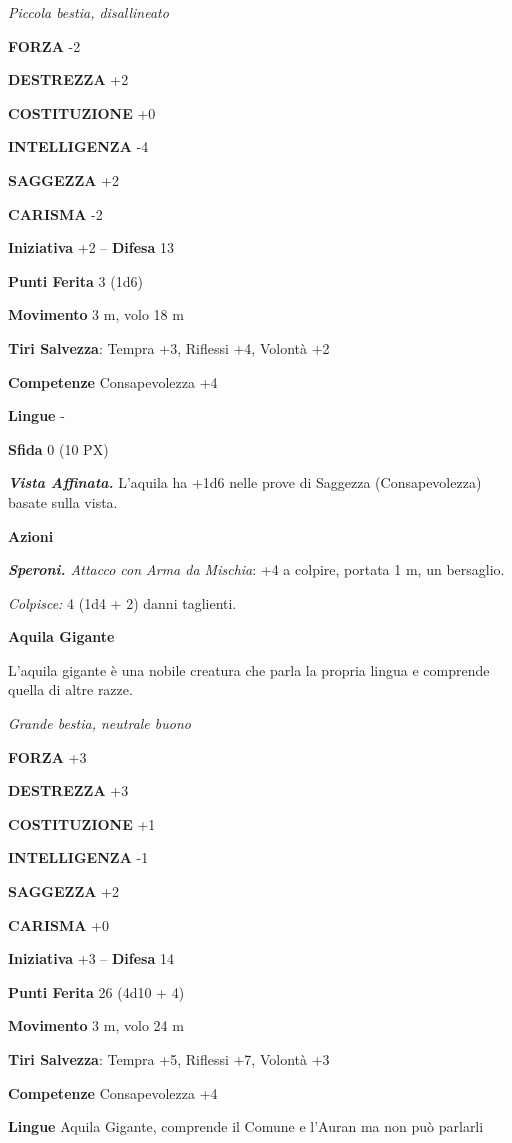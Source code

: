 \begin{multicols}{2}
\textit{Piccola bestia, disallineato}

\textbf{FORZA} -2

\textbf{DESTREZZA} +2

\textbf{COSTITUZIONE} +0

\textbf{INTELLIGENZA} -4

\textbf{SAGGEZZA} +2

\textbf{CARISMA} -2

\textbf{Iniziativa} +2 -- \textbf{Difesa} 13

\textbf{Punti Ferita} 3 (1d6)

\textbf{Movimento} 3 m, volo 18 m

\textbf{Tiri Salvezza}: Tempra +3, Riflessi +4, Volontà +2

\textbf{Competenze} Consapevolezza +4

\textbf{Lingue} -

\textbf{Sfida} 0 (10 PX)

\textit{\textbf{Vista Affinata.}} L'aquila ha +1d6 nelle prove di Saggezza (Consapevolezza) basate sulla vista.

\textbf{Azioni}

\textit{\textbf{Speroni.} Attacco con Arma da Mischia}: +4 a colpire, portata 1 m, un bersaglio.

\textit{Colpisce:} 4 (1d4 + 2) danni taglienti.

\medskip\textbf{Aquila Gigante}

L'aquila gigante è una nobile creatura che parla la propria lingua e comprende quella di altre razze.

\textit{Grande bestia, neutrale buono}

\textbf{FORZA} +3

\textbf{DESTREZZA} +3

\textbf{COSTITUZIONE} +1

\textbf{INTELLIGENZA} -1

\textbf{SAGGEZZA} +2

\textbf{CARISMA} +0

\textbf{Iniziativa} +3 -- \textbf{Difesa} 14

\textbf{Punti Ferita} 26 (4d10 + 4)

\textbf{Movimento} 3 m, volo 24 m

\textbf{Tiri Salvezza}: Tempra +5, Riflessi +7, Volontà +3

\textbf{Competenze} Consapevolezza +4

\textbf{Lingue} Aquila Gigante, comprende il Comune e l'Auran ma non può parlarli


\end{multicols}
